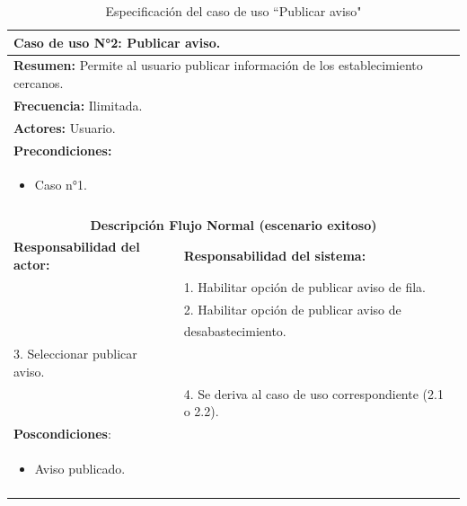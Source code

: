 \begin{table}[H]
    \centering
    \caption{Especificaci\'on del caso de uso ``Publicar aviso"}
    \begin{tabularx}{\textwidth}{|X|X|}
        \hline
        \multicolumn{2}{|l|}{\textbf{Caso de uso N°2:} Publicar aviso.}\\\hline
        \multicolumn{2}{|l|}{\textbf{Resumen:} Permite al usuario publicar información de los establecimiento cercanos.}\\\hline
        \multicolumn{2}{|l|}{\textbf{Frecuencia:} Ilimitada.}\\\hline
        \multicolumn{2}{|l|}{\textbf{Actores:} Usuario.}\\\hline
        \multicolumn{2}{|l|}{\textbf{Precondiciones:}}\\
	    \multicolumn{2}{|l|}{\begin{minipage}[t]{0,8\textwidth}
        \begin{itemize}
            \item Caso n°1.
        \end{itemize}
        \end{minipage}}\\
        \multicolumn{2}{|l|}{}\\\hline
        \multicolumn{2}{|c|}{\textbf{Descripci\'on Flujo Normal (escenario exitoso)}}\\\hline
        \textbf{Responsabilidad del actor:} & \textbf{Responsabilidad del sistema:}\\ \hline
        &1. Habilitar opción de publicar aviso de fila.\\
        &2. Habilitar opción de publicar aviso de\\
        &desabastecimiento.\\
        3. Seleccionar publicar aviso.&\\
        &4. Se deriva al caso de uso correspondiente (2.1 o 2.2).\\\hline
        \multicolumn{2}{|l|}{\textbf{Poscondiciones}:}\\
        \multicolumn{2}{|l|}{\begin{minipage}[t]{0,8\textwidth}
        \begin{itemize}
            \item Aviso publicado.
        \end{itemize}
        \end{minipage}}\\
        \multicolumn{2}{|l|}{}\\\hline  
    \end{tabularx}
    \label{usecase2}
\end{table}

